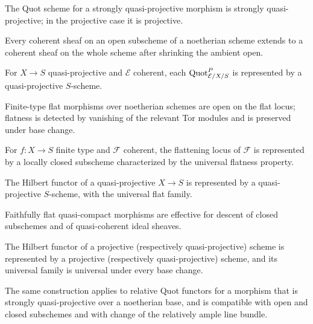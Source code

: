 \begin{theorem}\label{fga-thm-5-18}
The Quot scheme for a strongly quasi-projective morphism is strongly
quasi-projective; in the projective case it is projective.
\end{theorem}
\begin{lemma}\label{fga-lem-5-19}\uses{}
Every coherent sheaf on an open subscheme of a noetherian scheme extends to a
coherent sheaf on the whole scheme after shrinking the ambient open.
\end{lemma}\begin{theorem}\label{fga-thm-5-20}
For $X\to S$ quasi-projective and $\mathcal E$ coherent, each
$\operatorname{Quot}^P_{\mathcal E/X/S}$ is represented by a quasi-projective $S$-scheme.
\end{theorem}
\begin{lemma}\label{fga-lem-5-21}
Finite-type flat morphisms over noetherian schemes are open on the flat locus;
flatness is detected by vanishing of the relevant Tor modules and is preserved
under base change.
\end{lemma}
\begin{theorem}\label{fga-thm-5-22}
For $f:X\to S$ finite type and $\mathcal F$ coherent, the flattening locus of
$\mathcal F$ is represented by a locally closed subscheme characterized by the
universal flatness property.
\end{theorem}
\begin{theorem}\label{fga-thm-5-23}
The Hilbert functor of a quasi-projective $X\to S$ is represented by a
quasi-projective $S$-scheme, with the universal flat family.
\end{theorem}
\begin{lemma}\label{fga-lem-5-24}
Faithfully flat quasi-compact morphisms are effective for descent of closed
subschemes and of quasi-coherent ideal sheaves.
\end{lemma}
\begin{theorem}\label{fga-thm-5-25}
The Hilbert functor of a projective (respectively quasi-projective) scheme is
represented by a projective (respectively quasi-projective) scheme, and its
universal family is universal under every base change.
\end{theorem}
\begin{theorem}\label{fga-thm-5-26}
The same construction applies to relative Quot functors for a morphism that is
strongly quasi-projective over a noetherian base, and is compatible with open
and closed subschemes and with change of the relatively ample line bundle.
\end{theorem}

